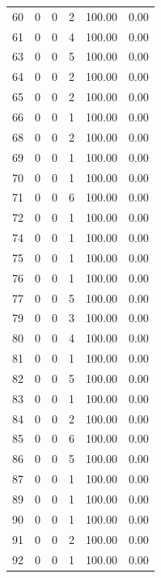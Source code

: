 \documentclass[11pt]{article}
\begin{document}
\begin{longtable}{r|r|r|r|r|r}
    60    & 0     & 0     & 2     & 100.00 & 0.00 \\
    61    & 0     & 0     & 4     & 100.00 & 0.00 \\
    63    & 0     & 0     & 5     & 100.00 & 0.00 \\
    64    & 0     & 0     & 2     & 100.00 & 0.00 \\
    65    & 0     & 0     & 2     & 100.00 & 0.00 \\
    66    & 0     & 0     & 1     & 100.00 & 0.00 \\
    68    & 0     & 0     & 2     & 100.00 & 0.00 \\
    69    & 0     & 0     & 1     & 100.00 & 0.00 \\
    70    & 0     & 0     & 1     & 100.00 & 0.00 \\
    71    & 0     & 0     & 6     & 100.00 & 0.00 \\
    72    & 0     & 0     & 1     & 100.00 & 0.00 \\
    74    & 0     & 0     & 1     & 100.00 & 0.00 \\
    75    & 0     & 0     & 1     & 100.00 & 0.00 \\
    76    & 0     & 0     & 1     & 100.00 & 0.00 \\
    77    & 0     & 0     & 5     & 100.00 & 0.00 \\
    79    & 0     & 0     & 3     & 100.00 & 0.00 \\
    80    & 0     & 0     & 4     & 100.00 & 0.00 \\
    81    & 0     & 0     & 1     & 100.00 & 0.00 \\
    82    & 0     & 0     & 5     & 100.00 & 0.00 \\
    83    & 0     & 0     & 1     & 100.00 & 0.00 \\
    84    & 0     & 0     & 2     & 100.00 & 0.00 \\
    85    & 0     & 0     & 6     & 100.00 & 0.00 \\
    86    & 0     & 0     & 5     & 100.00 & 0.00 \\
    87    & 0     & 0     & 1     & 100.00 & 0.00 \\
    89    & 0     & 0     & 1     & 100.00 & 0.00 \\
    90    & 0     & 0     & 1     & 100.00 & 0.00 \\
    91    & 0     & 0     & 2     & 100.00 & 0.00 \\
    92    & 0     & 0     & 1     & 100.00 & 0.00 \\

\end{longtable}
\end{document}
